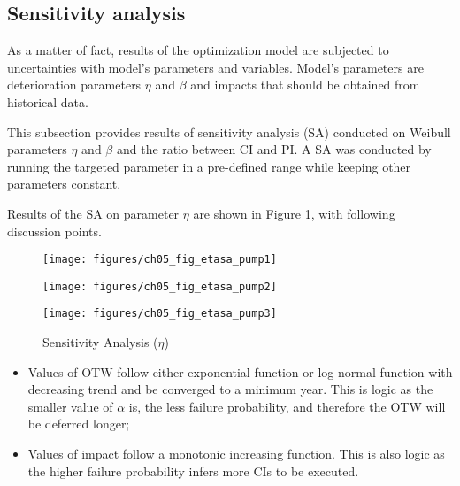 \subsection{Sensitivity analysis}
As a matter of fact, results of the optimization model are subjected to uncertainties with model's parameters and variables. Model's parameters are deterioration parameters $\eta$ and $\beta$ and impacts that should be obtained from historical data.

This subsection provides results of sensitivity analysis (SA) conducted on Weibull parameters $\eta$ and $\beta$ and the ratio between CI and PI. A SA was conducted by running the targeted parameter in a pre-defined range while keeping other parameters constant.

Results of the SA on parameter $\eta$ are shown in Figure \ref{ch05_fig_sa_alpha}, with following discussion points.

\begin{figure}[!htb]
	\begin{minipage}[b]{0.5\linewidth}
		\centering
		\texttt{[image: figures/ch05\_fig\_etasa\_pump1]}
		\caption*{a - BP\#1}
	\end{minipage}
	\hspace{0.05cm}
	\begin{minipage}[b]{0.5\linewidth}
		\centering
		\texttt{[image: figures/ch05\_fig\_etasa\_pump2]}
		\caption*{b - BP\#2}
	\end{minipage}
	\hspace{0.05cm}
	\begin{minipage}[b]{0.5\linewidth}
		\centering
		\texttt{[image: figures/ch05\_fig\_etasa\_pump3]}
		\caption*{c - BP\#3}
	\end{minipage}
	\caption{Sensitivity Analysis ($\eta$)}
	\label{ch05_fig_sa_alpha}
\end{figure}

\begin{itemize}
\item Values of OTW follow either exponential function or log-normal function with decreasing trend and be converged to a minimum year. This is logic as the smaller value of $\alpha$ is, the less failure probability, and therefore the OTW will be deferred longer;
\item Values of impact follow a monotonic increasing function. This is also logic as the higher failure probability infers more CIs to be executed.
\end{itemize}

